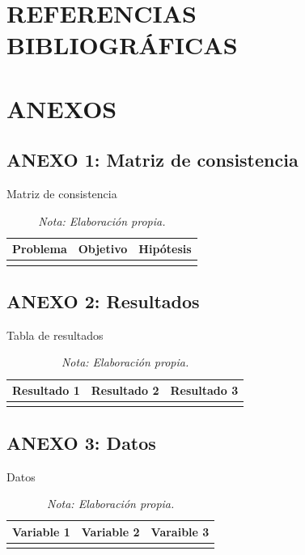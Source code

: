 \documentclass[12pt,a4paper]{article} %
\begin{document}
	\section{REFERENCIAS BIBLIOGRÁFICAS}
		
			
	\newpage
	\section{ANEXOS}
		\subsection{ANEXO 1: Matriz de consistencia}
			\begin{table}[H]
				\centering
				\caption{Matriz de consistencia}
				\begin{tabular}{p{5cm}p{5cm}p{5cm}}
					\hline
					Problema & Objetivo & Hipótesis\\
					\hline
					\lipsum[1] & \lipsum[1] & \lipsum[1]\\
					\hline
				\end{tabular}
				\vspace{2mm}
				\caption*{\it Nota: Elaboración propia.}
				\label{tab: Matriz de consistencia}
			\end{table}
		\newpage
		\subsection{ANEXO 2: Resultados }
			\begin{table}[H]
				\centering
				\caption{Tabla de resultados}
				\begin{tabular}{p{5cm}p{5cm}p{5cm}}
					\hline
					Resultado 1 & Resultado 2 & Resultado 3\\
					\hline
					\lipsum[1] & \lipsum[1] & \lipsum[1]\\
					\hline
				\end{tabular}
				\vspace{2mm}
				\caption*{\it Nota: Elaboración propia.}
				\label{tab: Resultados}
			\end{table}
		\newpage
		\subsection{ANEXO 3: Datos }
			\begin{table}[H]
				\centering
				\caption{Datos}
				\begin{tabular}{p{5cm}p{5cm}p{5cm}}
					\hline
					Variable 1 & Variable 2 & Varaible 3\\
					\hline
					\lipsum[1] & \lipsum[1] & \lipsum[1]\\
					\hline
				\end{tabular}
				\vspace{2mm}
				\caption*{\it Nota: Elaboración propia.}
				\label{tab: Datos}
			\end{table}
		\newpage 
\end{document}
